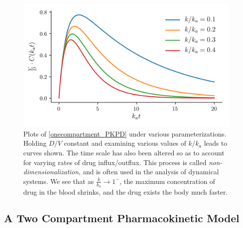 \begin{figure}[h!]
	\centering
	\includegraphics{Figures/pkcureves.png}
	\caption{Plots of \cref{onecompartment_PKPD} under various parameterizations.  Holding $D/V$ constant and examining various values of $k/k_a$ leads to curves shown.  The time scale has also been altered so as to account for varying rates of drug influx/outflux.  This process is called \textit{non-dimensionalization}, and is often used in the analysis of dynamical systems.  We see that as $\frac{k}{k_a} \rightarrow 1^-$, the maximum concentration of drug in the blood shrinks, and the drug exists the body much faster.}
	\label{fig:pkcureves}
\end{figure}


\subsection{A Two Compartment Pharmacokinetic Model}
